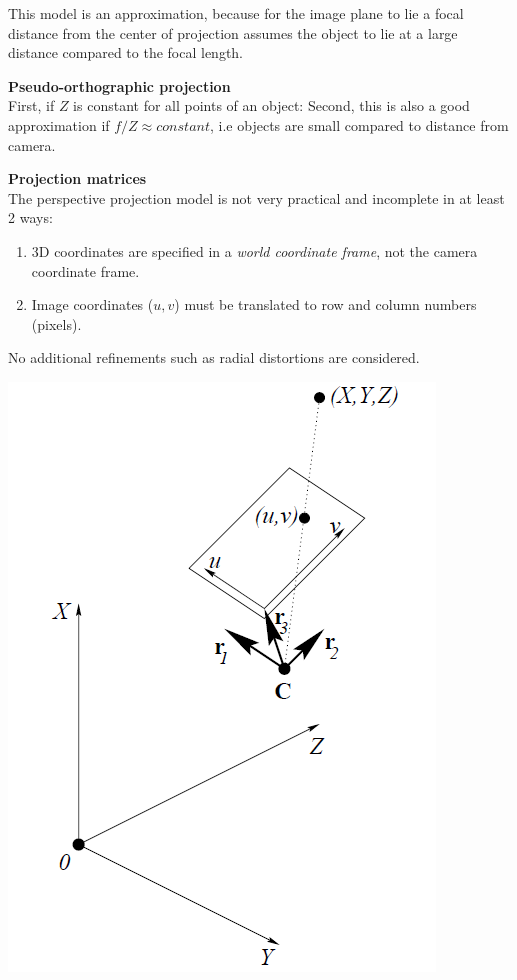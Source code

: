 \documentclass[a4paper, fontsize=8pt, landscape, DIV=1]{scrartcl}
\begin{document}
\begin{multicols*}{4}
		This model is an approximation, because for the image plane to lie a focal distance from the center of projection assumes the object to lie at a large distance compared to the focal length.
		\par 
		\textbf{Pseudo-orthographic projection}\\
		First, if $Z$ is constant for all points of an object:
		Second, this is also a good approximation if $f/Z\approx constant$, i.e objects are small compared to distance from camera.
		\par 
		\textbf{Projection matrices}\\
		The perspective projection model is not very practical and incomplete in at least 2 ways: 
		\begin{enumerate}[noitemsep]
			\item 3D coordinates are specified in a \textit{world coordinate frame}, not the camera coordinate frame.
			\item Image coordinates ($u,v$) must be translated to row and column numbers (pixels). 
		\end{enumerate}
		No additional refinements such as radial distortions are considered. 
		\begin{center}
			\includegraphics[width=0.7\columnwidth]{images/ImageAcq/rotation_matrices.png}\\

\end{center}
\end{multicols*}
\end{document}

